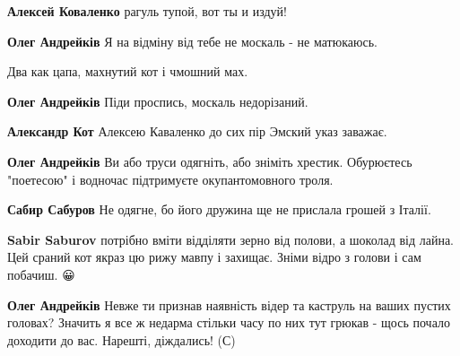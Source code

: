\begin{itemize}
\begin{itemize}
\textbf{Алексей Коваленко} рагуль тупой, вот ты и издуй!


\textbf{Олег Андрейків} Я на відміну від тебе не москаль - не матюкаюсь.


Два как цапа, махнутий кот і чмошний мах. 🤣


\textbf{Олег Андрейків} Піди проспись, москаль недорізаний.


\textbf{Александр Кот} Алексею Каваленко до сих пір Эмский указ заважає.


\textbf{Олег Андрейків} Ви або труси одягніть, або зніміть хрестик. Обурюєтесь "поетесою" і водночас підтримуєте окупантомовного троля.


\textbf{Сабир Сабуров} Не одягне, бо його дружина ще не прислала грошей з Італії.


\textbf{Sabir Saburov} потрібно вміти відділяти зерно від полови, а шоколад від лайна. Цей сраний кот якраз цю рижу мавпу і захищає. Зніми відро з голови і сам побачиш. 😀


\textbf{Олег Андрейків} Невже ти признав наявність відер та каструль на ваших пустих головах? Значить я все ж недарма стільки часу по них тут грюкав - щось почало доходити до вас. Нарешті, діждались! (С) 🤣
\end{itemize}




\end{itemize}
